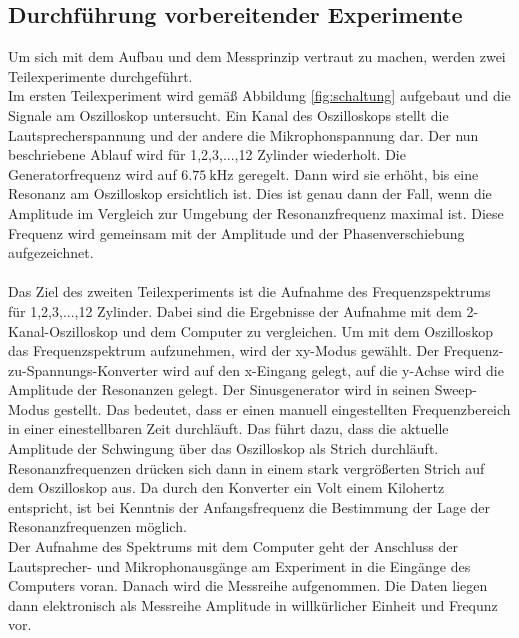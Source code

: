 \subsection{Durchführung vorbereitender Experimente}
\label{subsec:durchfuehrungVorbereitender}
Um sich mit dem Aufbau und dem Messprinzip vertraut zu machen, werden zwei Teilexperimente durchgeführt.\\
Im ersten Teilexperiment wird gemäß Abbildung \ref{fig:schaltung} aufgebaut und die Signale am Oszilloskop untersucht. Ein Kanal des Oszilloskops stellt die Lautsprecherspannung und der andere die Mikrophonspannung dar. Der nun beschriebene Ablauf wird für 1,2,3,...,12 Zylinder wiederholt. Die Generatorfrequenz wird auf $\SI{6.75}{\kilo\hertz}$ geregelt. Dann wird sie erhöht, bis eine Resonanz am Oszilloskop ersichtlich ist. Dies ist genau dann der Fall, wenn die Amplitude im Vergleich zur Umgebung der Resonanzfrequenz maximal ist. Diese Frequenz wird gemeinsam mit der Amplitude und der Phasenverschiebung aufgezeichnet.\\\\
Das Ziel des zweiten Teilexperiments ist die Aufnahme des Frequenzspektrums für 1,2,3,...,12 Zylinder. Dabei sind die Ergebnisse der Aufnahme mit dem 2-Kanal-Oszilloskop und dem Computer zu vergleichen. Um mit dem Oszilloskop das Frequenzspektrum aufzunehmen, wird der xy-Modus gewählt. Der Frequenz-zu-Spannungs-Konverter wird auf den x-Eingang gelegt, auf die y-Achse wird die Amplitude der Resonanzen gelegt.
Der Sinusgenerator wird in seinen Sweep-Modus gestellt. Das bedeutet, dass er einen manuell eingestellten Frequenzbereich in einer einestellbaren Zeit durchläuft. Das führt dazu, dass die aktuelle Amplitude der Schwingung über das Oszilloskop als Strich durchläuft. Resonanzfrequenzen drücken sich dann in einem stark vergrößerten Strich auf dem Oszilloskop aus. Da durch den Konverter ein Volt einem Kilohertz entspricht, ist bei Kenntnis der Anfangsfrequenz die Bestimmung der Lage der Resonanzfrequenzen möglich.\\
Der Aufnahme des Spektrums mit dem Computer geht der Anschluss der Lautsprecher- und Mikrophonausgänge am Experiment in die Eingänge des Computers voran. Danach wird die Messreihe aufgenommen. Die Daten liegen dann elektronisch als Messreihe Amplitude in willkürlicher Einheit und Frequnz vor.

